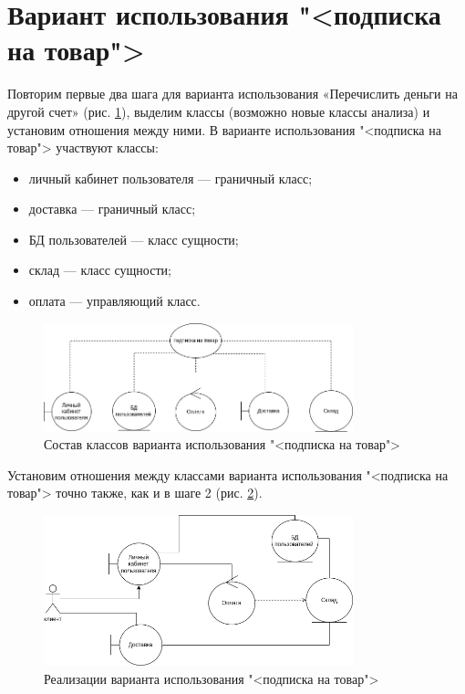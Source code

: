 \section{Вариант использования "<подписка на товар">}
Повторим первые два шага для варианта использования
«Перечислить деньги на другой счет» (рис. \ref{fig:subscription}),
выделим классы (возможно новые классы анализа) и установим отношения
между ними. В варианте использования "<подписка на товар"> участвуют классы:
\begin{itemize}
	\item личный кабинет пользователя --- граничный класс;
	\item доставка --- граничный класс;
	\item БД пользователей --- класс сущности;
	\item склад --- класс сущности;
	\item оплата --- управляющий класс.
\end{itemize}
\begin{figure}[h!tp]
	\centering
	\includegraphics[width=0.8\textwidth]{uml_subscription}
	\caption{Состав классов варианта использования "<подписка на товар">}
	\label{fig:subscription}
\end{figure}

Установим отношения между классами варианта использования "<подписка на товар">
точно также, как и в шаге 2 (рис. \ref{fig:subscription:impl}).
\begin{figure}[h!tp]
	\centering
	\includegraphics[width=0.8\textwidth]{uml_subscr_impl}
	\caption{Реализации варианта использования "<подписка на товар">}
	\label{fig:subscription:impl}
\end{figure}

